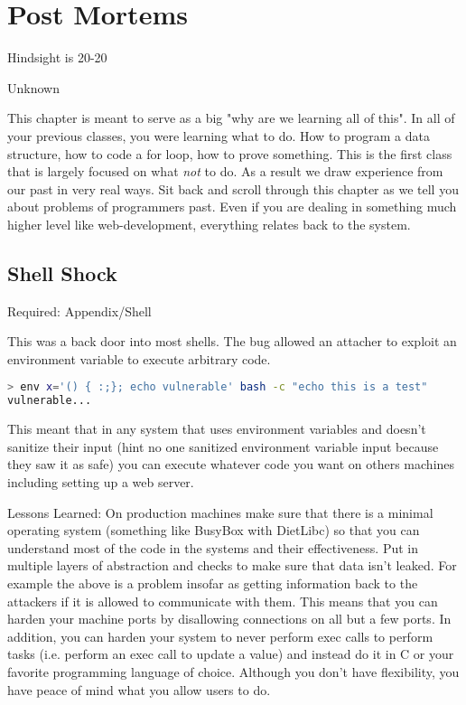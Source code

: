 \chapter{Post Mortems}

\epigraph{Hindsight is 20-20}{Unknown}

This chapter is meant to serve as a big "why are we learning all of this". In all of your previous classes, you were learning what to do. How to program a data structure, how to code a for loop, how to prove something. This is the first class that is largely focused on what \textit{not} to do. As a result we draw experience from our past in very real ways. Sit back and scroll through this chapter as we tell you about problems of programmers past. Even if you are dealing in something much higher level like web-development, everything relates back to the system.

\section{Shell Shock}

Required: Appendix/Shell

This was a back door into most shells. The bug allowed an attacher to exploit an environment variable to execute arbitrary code.

\begin{lstlisting}[language=bash]
> env x='() { :;}; echo vulnerable' bash -c "echo this is a test"
vulnerable...
\end{lstlisting}

This meant that in any system that uses environment variables and doesn't sanitize their input (hint no one sanitized environment variable input because they saw it as safe) you can execute whatever code you want on others machines including setting up a web server.

Lessons Learned: On production machines make sure that there is a minimal operating system (something like BusyBox with DietLibc) so that you can understand most of the code in the systems and their effectiveness. Put in multiple layers of abstraction and checks to make sure that data isn't leaked. For example the above is a problem insofar as getting information back to the attackers if it is allowed to communicate with them. This means that you can harden your machine ports by disallowing connections on all but a few ports. In addition, you can harden your system to never perform exec calls to perform tasks (i.e. perform an exec call to update a value) and instead do it in C or your favorite programming language of choice. Although you don't have flexibility, you have peace of mind what you allow users to do.

